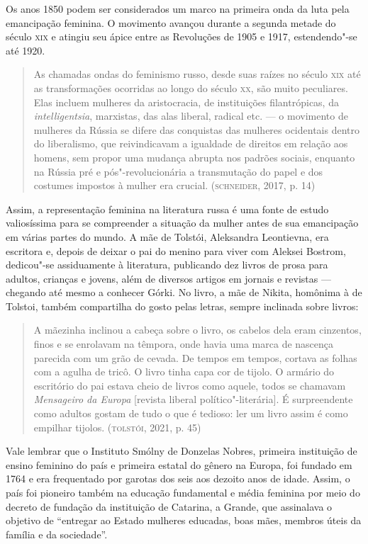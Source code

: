 \documentclass{article}
\begin{document}
Os anos 1850 podem ser considerados um marco na primeira onda da luta
pela emancipação feminina. O movimento avançou durante a segunda metade
do século \textsc{xix} e atingiu seu ápice entre as Revoluções de 1905 e 1917,
estendendo"-se até 1920.

\begin{quote}
As chamadas ondas do feminismo russo, desde suas raízes no século \textsc{xix}
até as transformações ocorridas ao longo do século \textsc{xx}, são muito
peculiares. Elas incluem mulheres da aristocracia, de instituições
filantrópicas, da \emph{intelligentsia}, marxistas, das alas liberal,
radical etc. --- o movimento de mulheres da Rússia se difere das
conquistas das mulheres ocidentais dentro do liberalismo, que
reivindicavam a igualdade de direitos em relação aos homens, sem propor
uma mudança abrupta nos padrões sociais, enquanto na Rússia pré e
pós"-revolucionária a transmutação do papel e dos costumes impostos à
mulher era crucial. (\textsc{schneider}, 2017, p. 14)
\end{quote}

Assim, a representação feminina na literatura russa é uma fonte de
estudo valiosíssima para se compreender a situação da mulher antes de
sua emancipação em várias partes do mundo. A mãe de Tolstói, Aleksandra
Leontievna, era escritora e, depois de deixar o pai do menino para viver
com Aleksei Bostrom, dedicou"-se assiduamente à literatura, publicando
dez livros de prosa para adultos, crianças e jovens, além de diversos
artigos em jornais e revistas --- chegando até mesmo a conhecer Górki.
No livro, a mãe de Nikita, homônima à de Tolstoi, também compartilha do
gosto pelas letras, sempre inclinada sobre livros:

\begin{quote}
A mãezinha inclinou a cabeça sobre o livro, os cabelos dela eram
cinzentos, finos e se enrolavam na têmpora, onde havia uma marca de
nascença parecida com um grão de cevada. De tempos em tempos, cortava as
folhas com a agulha de tricô. O livro tinha capa cor de tijolo. O
armário do escritório do pai estava cheio de livros como aquele, todos
se chamavam \emph{Mensageiro da Europa} {[}revista liberal
político"-literária{]}. É surpreendente como adultos gostam de tudo o que
é tedioso: ler um livro assim é como empilhar tijolos. (\textsc{tolstói}, 2021,
p. 45)
\end{quote}

Vale lembrar que o Instituto Smólny de Donzelas Nobres, primeira
instituição de ensino feminino do país e primeira estatal do gênero na
Europa, foi fundado em 1764 e era frequentado por garotas dos seis aos
dezoito anos de idade. Assim, o país foi pioneiro também na educação
fundamental e média feminina por meio do decreto de fundação da
instituição de Catarina, a Grande, que assinalava o objetivo de
``entregar ao Estado mulheres educadas, boas mães, membros úteis da
família e da sociedade''.
\end{document}
